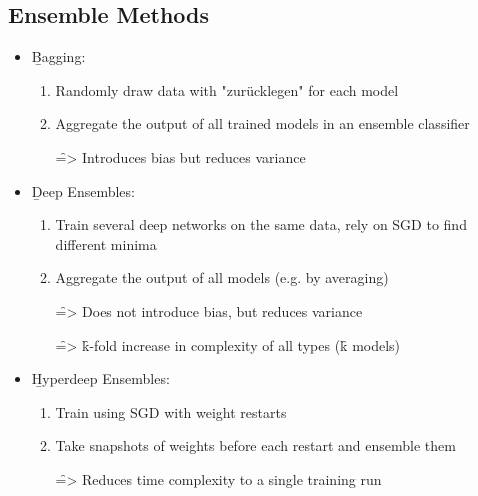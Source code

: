 \subsection{Ensemble Methods}
\begin{itemize}
    \item \b{Bagging:}
    \begin{enumerate}
        \item Randomly draw data with "zurücklegen" for each model
        \item Aggregate the output of all trained models in an ensemble classifier
        \item[\f{=>}] Introduces bias but reduces variance
    \end{enumerate} 
    \item \b{Deep Ensembles:}
    \begin{enumerate}
        \item Train several deep networks on the same data, rely on SGD to find different minima
        \item Aggregate the output of all models (e.g. by averaging)
        \item[\f{=>}] Does not introduce bias, but reduces variance
        \item[\f{=>}] \f{k}-fold increase in complexity of all types (\f{k} models)
    \end{enumerate}
    \item \b{Hyperdeep Ensembles:}
    \begin{enumerate}
        \item Train using SGD with weight restarts
        \item Take snapshots of weights before each restart and ensemble them 
        \item[\f{=>}] Reduces time complexity to a single training run
    \end{enumerate}
\end{itemize}